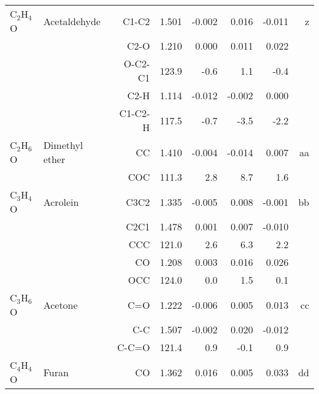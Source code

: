 \begin{table}
\begin{center}
\begin{tabular}{llrrrrrr}
 C$_2$H$_4$O       & Acetaldehyde                       &C1-C2         &     1.501   &    -0.002 &     0.016 &    -0.011 &     z \\
             &                                    &C2-O          &     1.210   &     0.000 &     0.011 &     0.022 &       \\
             &                                    &O-C2-C1     &     123.9   &      -0.6 &       1.1 &      -0.4   &       \\
             &                                    &C2-H          &     1.114   &    -0.012 &    -0.002 &     0.000 &       \\
             &                                    &C1-C2-H     &     117.5   &      -0.7 &      -3.5 &      -2.2   &       \\
 C$_2$H$_6$O       & Dimethyl ether                     &CC            &     1.410   &    -0.004 &    -0.014 &     0.007 &    aa \\
             &                                    &COC         &     111.3   &       2.8 &       8.7 &       1.6   &       \\
 C$_3$H$_4$O       & Acrolein                           &C3C2          &     1.335   &    -0.005 &     0.008 &    -0.001 &    bb \\
             &                                    &C2C1          &     1.478   &     0.001 &     0.007 &    -0.010 &       \\
             &                                    &CCC         &     121.0   &       2.6 &       6.3 &       2.2   &       \\
             &                                    &CO            &     1.208   &     0.003 &     0.016 &     0.026 &       \\
             &                                    &OCC         &     124.0   &       0.0 &       1.5 &       0.1   &       \\
 C$_3$H$_6$O       & Acetone                            &C=O           &     1.222   &    -0.006 &     0.005 &     0.013 &    cc \\
             &                                    &C-C           &     1.507   &    -0.002 &     0.020 &    -0.012 &       \\
             &                                    &C-C=O       &     121.4   &       0.9 &      -0.1 &       0.9   &       \\
 C$_4$H$_4$O       & Furan                              &CO            &     1.362   &     0.016 &     0.005 &     0.033 &    dd \\

\end{tabular}
\end{center}
\end{table}

